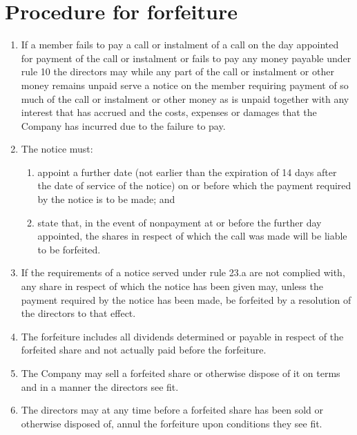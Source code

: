 \section{Procedure for forfeiture}

\begin{enumerate}[label=(\alph*)]
    \item If a member fails to pay a call or instalment of a call on the day appointed for payment of the call or instalment or fails to pay any money payable under rule 10 the directors may while any part of the call or instalment or other money remains unpaid serve a notice on the member requiring payment of so much of the call or instalment or other money as is unpaid together with any interest that has accrued and the costs, expenses or damages that the Company has incurred due to the failure to pay.
    
    \item The notice must:
    \begin{enumerate}[label=(\roman*)]
        \item appoint a further date (not earlier than the expiration of 14 days after the date of service of the notice) on or before which the payment required by the notice is to be made; and
        \item state that, in the event of nonpayment at or before the further day appointed, the shares in respect of which the call was made will be liable to be forfeited.
    \end{enumerate}
    
    \item If the requirements of a notice served under rule 23.a are not complied with, any share in respect of which the notice has been given may, unless the payment required by the notice has been made, be forfeited by a resolution of the directors to that effect.
    
    \item The forfeiture includes all dividends determined or payable in respect of the forfeited share and not actually paid before the forfeiture.
    
    \item The Company may sell a forfeited share or otherwise dispose of it on terms and in a manner the directors see fit.
    
    \item The directors may at any time before a forfeited share has been sold or otherwise disposed of, annul the forfeiture upon conditions they see fit.
    

\end{enumerate}
